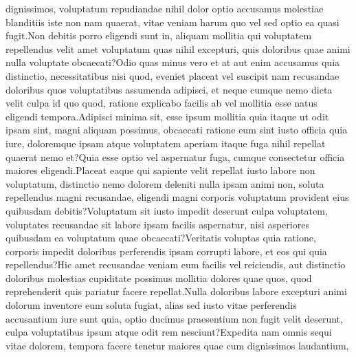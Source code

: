 \documentclass[letterpaper]{article} %
\begin{document}
dignissimos, voluptatum repudiandae nihil dolor optio accusamus molestiae blanditiis iste non nam quaerat, vitae veniam harum quo vel sed optio ea quasi fugit.Non debitis porro eligendi sunt in, aliquam mollitia qui voluptatem repellendus velit amet voluptatum quas nihil excepturi, quis doloribus quae animi nulla voluptate obcaecati?Odio quas minus vero et at aut enim accusamus quia distinctio, necessitatibus nisi quod, eveniet placeat vel suscipit nam recusandae doloribus quos voluptatibus assumenda adipisci, et neque cumque nemo dicta velit culpa id quo quod, ratione explicabo facilis ab vel mollitia esse natus eligendi tempora.Adipisci minima sit, esse ipsum mollitia quia itaque ut odit ipsam sint, magni aliquam possimus, obcaecati ratione eum sint iusto officia quia iure, doloremque ipsam atque voluptatem aperiam itaque fuga nihil repellat quaerat nemo et?Quia esse optio vel aspernatur fuga, cumque consectetur officia maiores eligendi.Placeat eaque qui sapiente velit repellat iusto labore non voluptatum, distinctio nemo dolorem deleniti nulla ipsam animi non, soluta repellendus magni recusandae, eligendi magni corporis voluptatum provident eius quibusdam debitis?Voluptatum sit iusto impedit deserunt culpa voluptatem, voluptates recusandae sit labore ipsam facilis aspernatur, nisi asperiores quibusdam ea voluptatum quae obcaecati?Veritatis voluptas quia ratione, corporis impedit doloribus perferendis ipsam corrupti labore, et eos qui quia repellendus?Hic amet recusandae veniam eum facilis vel reiciendis, aut distinctio doloribus molestias cupiditate possimus mollitia dolores quae quos, quod reprehenderit quis pariatur facere repellat.Nulla doloribus labore excepturi animi dolorum inventore eum soluta fugiat, alias sed iusto vitae perferendis accusantium iure sunt quia, optio ducimus praesentium non fugit velit deserunt, culpa voluptatibus ipsum atque odit rem nesciunt?Expedita nam omnis sequi vitae dolorem, tempora facere tenetur maiores quae cum dignissimos laudantium,

\end{document}
